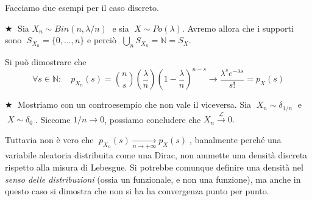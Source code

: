 \begin{esempio}
    Facciamo due esempi per il caso discreto.

    \bigskip
    \noindent \(\bigstar\;\) Sia $X_n\sim Bin(n , \lambda/n)\;$ e sia $\;X\sim Po(\lambda)$. Avremo allora che i supporti sono $\;S_{X_n} = \{0, ..., n\}$ e perciò $\;\bigcup_nS_{X_n} = \mathbb N = S_X$.

    \medskip Si può dimostrare che 
    \[\forall s\in \mathbb N:\quad p_{X_n}(s) = \binom{n}{s} \left(\frac{\lambda}{n}\right)\left(1- \frac\lambda n\right)^{n-s} \longrightarrow \frac{\lambda^s e^{-\lambda s}}{s!} = p_X(s)\]

    \bigskip
    \noindent \(\bigstar\;\) Mostriamo con un controesempio che non vale il viceversa. Sia $\;X_n\sim \delta_{1/n}\;$ e $\;X\sim \delta_0\;$. Siccome $1/n \longrightarrow0$, possiamo concludere che $X_n \overset{\mathcal{L}}{\longrightarrow}0.$

    \medskip Tuttavia non è vero che $\;p_{X_n}(s) \underset{n\to+\infty}{\longrightarrow}p_X(s)\;$, banalmente perché una variabile aleatoria distribuita come una Dirac, non ammette una densità discreta rispetto alla misura di Lebesgue. Si potrebbe comunque definire una densità nel \textit{senso delle distribuzioni} (ossia un funzionale, e non una funzione), ma anche in questo caso si dimostra che non si ha ha convergenza punto per punto.
\end{esempio}


